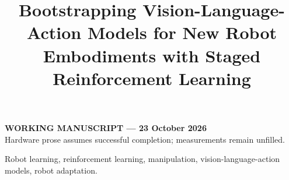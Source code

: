 \documentclass[letterpaper,journal]{IEEEtran}
\begin{document}
\title{Bootstrapping Vision-Language-Action Models for New Robot Embodiments with Staged Reinforcement Learning}
\author{\vspace{1em}}
\maketitle
\begin{center}\small\textbf{WORKING MANUSCRIPT --- 23 October 2026}\\
Hardware prose assumes successful completion; measurements remain unfilled.
\end{center}

\begin{IEEEkeywords}
Robot learning, reinforcement learning, manipulation, vision-language-action models, robot adaptation.
\end{IEEEkeywords}











\end{document}
